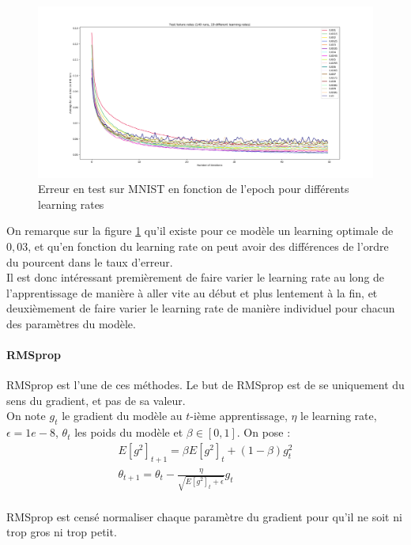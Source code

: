 \begin{figure}[ht]
 \centering
 \includegraphics[width=1.1\textwidth]{img/learning_rates.png}
 \caption{Erreur en test sur MNIST en fonction de l'epoch pour différents learning rates}
 \label{fig:learning_rates.png}
\end{figure}

On remarque sur la figure \ref{fig:learning_rates.png} qu'il existe pour ce modèle un learning optimale de $0,03$, et qu'en fonction du learning rate on peut avoir
des différences de l'ordre du pourcent dans le taux d'erreur.
\\
Il est donc intéressant premièrement de faire varier le learning rate au long de l'apprentissage de manière à aller vite au début et plus lentement à la fin, et deuxièmement
de faire varier le learning rate de manière individuel pour chacun des paramètres du modèle.

\paragraph{RMSprop}

RMSprop est l'une de ces méthodes. Le but de RMSprop est de se  uniquement du sens du gradient, et pas de sa valeur. \\
On note $g_t$ le gradient du modèle au $t$-ième apprentissage, $\eta$ le learning rate, $\epsilon = 1e-8$, $\theta_t$ les poids du modèle et $\beta \in [0,1]$.
On pose :
\begin{align*}
E[g^2]_{t+1} = \beta E[g^2]_{t} + (1-\beta) g_t^2 \\
\theta_{t+1} = \theta_t - \frac{\eta}{\sqrt{E[g^2]_{t} + \epsilon }} g_t \\
\end{align*}

RMSprop est censé normaliser chaque paramètre du gradient pour qu'il ne soit ni trop gros ni trop petit.

